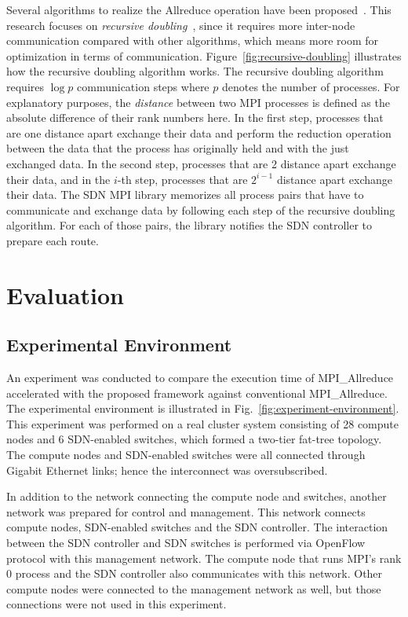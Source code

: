 Several algorithms to realize the Allreduce operation have been
proposed~\autocite{Rabenseifner2004,Thakur2005,Kandalla2012,Ruefenacht2017}.
This research focuses on \emph{recursive doubling}~\autocite{Thakur2005},
since it requires more inter-node communication compared with other
algorithms, which means more room for optimization in terms of communication.
Figure~\ref{fig:recursive-doubling} illustrates how the recursive doubling
algorithm works. The recursive doubling algorithm requires $\log p$
communication steps where $p$ denotes the number of processes. For explanatory
purposes, the \emph{distance} between two MPI processes is defined as the
absolute difference of their rank numbers here. In the first step, processes
that are one distance apart exchange their data and perform the reduction
operation between the data that the process has originally held and with the
just exchanged data. In the second step, processes that are 2 distance apart
exchange their data, and in the $i$-th step, processes that are $2^{i - 1}$
distance apart exchange their data. The SDN MPI library memorizes all process
pairs that have to communicate and exchange data by following each step of the
recursive doubling algorithm. For each of those pairs, the library notifies
the SDN controller to prepare each route.

\section{Evaluation}\label{sec:iii-evaluation}

\subsection{Experimental Environment}

An experiment was conducted to compare the execution time of MPI\_Allreduce
accelerated with the proposed framework against conventional
MPI\_Allreduce. The experimental environment is illustrated in
Fig.~\ref{fig:experiment-environment}. This experiment was performed on
a real cluster system consisting of 28 compute nodes and 6 SDN-enabled
switches, which formed a two-tier fat-tree topology. The compute nodes and
SDN-enabled switches were all connected through Gigabit Ethernet links;
hence the interconnect was oversubscribed.

In addition to the network connecting the compute node and switches,
another network was prepared for control and management. This network
connects compute nodes, SDN-enabled switches and the SDN controller.
The interaction between the SDN controller and SDN switches is performed
via OpenFlow protocol with this management network. The compute node
that runs MPI's rank 0 process and the SDN controller also communicates
with this network. Other compute nodes were connected to the
management network as well, but those connections were not used in this
experiment.

